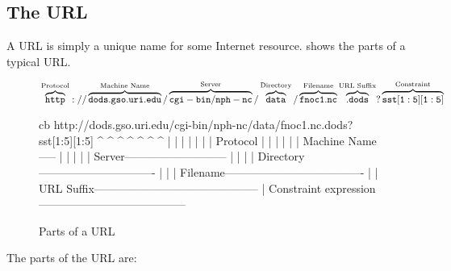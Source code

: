 \documentclass[justify]{dods-paper}
\begin{document}
\subsection{The URL}
\label{sec-url}

A URL is simply a unique name for some Internet resource.
 shows the parts of a typical \DAP URL.

\begin{figure}[h]
\texorhtml
{\begin{center}\small
${}\overbrace{\tt http}^{\textnormal{Protocol}}://
\overbrace{\tt dods.gso.uri.edu}^{\textnormal{Machine Name}}/
\overbrace{\tt cgi-bin/nph-nc}^{\textnormal{Server}}/
\overbrace{\tt data}^{\textnormal{Directory}}/
\overbrace{\tt fnoc1.nc}^{\textnormal{Filename}}
\overbrace{\tt .dods}^{\textnormal{URL Suffix}}?
\overbrace{\tt sst[1:5][1:5]}^{\textnormal{Constraint}}$
\end{center}}
{\begin{vcode}{cb}
http://dods.gso.uri.edu/cgi-bin/nph-nc/data/fnoc1.nc.dods?sst[1:5][1:5]
   ^            ^               ^      ^    ^        ^     ^
   |            |               |      |    |        |     |
Protocol        |               |      |    |        |     |
Machine Name-----               |      |    |        |     |
Server---------------------------      |    |        |     |
Directory-------------------------------    |        |     |
Filename-------------------------------------        |     |
URL Suffix--------------------------------------------     |
Constraint expression---------------------------------------
\end{vcode}}
\caption{Parts of a \DAP URL}
\label{fig-url-parts}
\end{figure}

The parts of the URL are:
\end{document}
